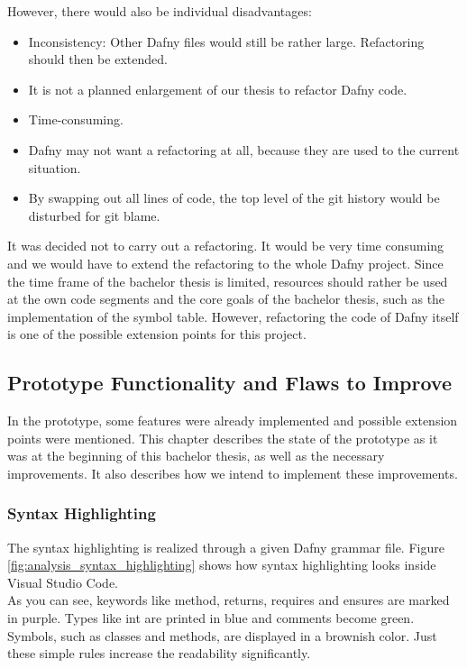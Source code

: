 However, there would also be individual disadvantages:
\begin{itemize}
    \item Inconsistency: Other Dafny files would still be rather large. Refactoring should then be extended.
    \item It is not a planned enlargement of our thesis to refactor Dafny code.
    \item Time-consuming.
    \item Dafny may not want a refactoring at all, because they are used to the current situation.
    \item By swapping out all lines of code, the top level of the git history would be disturbed for git blame.
\end{itemize}

It was decided not to carry out a refactoring.
It would be very time consuming and we would have to extend the refactoring to the whole Dafny project.
Since the time frame of the bachelor thesis is limited, resources should rather be used at the own code segments and the core goals of the bachelor thesis, such as the implementation of the symbol table.
However, refactoring the code of Dafny itself is one of the possible extension points for this project.

\subsection{Prototype Functionality and Flaws to Improve}
\label{section:analysis:features}
In the prototype, some features were already implemented and possible extension points were mentioned.
This chapter describes the state of the prototype as it was at the beginning of this bachelor thesis, as well as the necessary improvements.
It also describes how we intend to implement these improvements.

\subsubsection{Syntax Highlighting}
The syntax highlighting is realized through a given Dafny grammar file.
Figure \ref{fig:analysis_syntax_highlighting} shows how syntax highlighting looks inside Visual Studio Code. \\

As you can see, keywords like method, returns, requires and ensures are marked in purple.
Types like int are printed in blue and comments become green.
Symbols, such as classes and methods, are displayed in a brownish color.
Just these simple rules increase the readability significantly.

